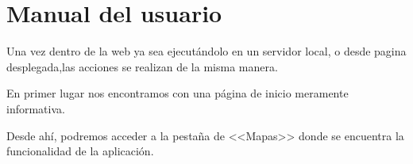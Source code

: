 %
%

\section{Manual del usuario}

Una vez dentro de la web ya sea ejecutándolo en un servidor local, o desde
pagina desplegada,las acciones se realizan de la misma manera.

En primer lugar nos encontramos con una página de inicio meramente informativa.

\label{pagina_inicio}

Desde ahí, podremos acceder a la pestaña de <<Mapas>> donde se encuentra la funcionalidad de la aplicación.

\label{pagina_mapas_web}

